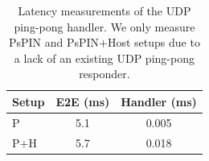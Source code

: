 \begin{table}[!h]
    \centering
    \begin{tabular}{lcc}
    \toprule
    Setup & E2E (ms) & Handler (ms) \\ \midrule
    P & 5.1 & 0.005 \\
    P+H & 5.7 & 0.018 \\
    \bottomrule
    \end{tabular}
    \caption{Latency measurements of the UDP ping-pong handler.  We only measure PsPIN and PsPIN+Host setups due to a lack of an existing UDP ping-pong responder.}
    \label{tab:udp-ping}
\end{table}
